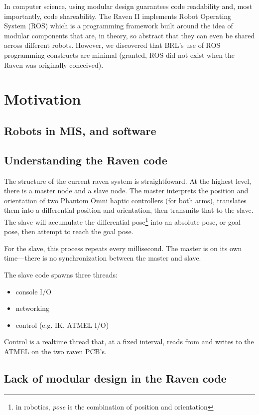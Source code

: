 \documentclass[letterpaper,twocolumn,10pt]{article}
\begin{document}
In computer science, using modular design guarantees code readability
and, most importantly, code shareability. The Raven II implements
Robot Operating System (ROS) which is a programming framework built
around the idea of modular components that are, in theory, so abstract
that they can even be shared across different robots. However, we
discovered that BRL's use of ROS programming constructs are minimal
(granted, ROS did not exist when the Raven was originally conceived).

\section{Motivation}

\subsection{Robots in MIS, and software}

\subsection{Understanding the Raven code}
The structure of the current raven system is straightfoward. At the
highest level, there is a master node and a slave node. The master
interprets the position and orientation of two Phantom Omni haptic
controllers (for both arms), translates them into a differential
position and orientation, then transmits that to the slave. The slave
will accumulate the differential pose\footnote{in robotics, \emph{pose}
  is the combination of position and orientation} into an absolute
pose, or goal pose, then attempt to reach the goal pose.

For the slave, this process repeats every millisecond. The master is
on its own time---there is no synchronization between the master and
slave.

The slave code spawns three threads:

\begin{itemize}
  \item console I/O
  \item networking
  \item control (e.g. IK, ATMEL I/O)
\end{itemize}

Control is a realtime thread that, at a fixed interval, reads from and
writes to the ATMEL on the two raven PCB's.

\subsection{Lack of modular design in the Raven code}
\end{document}
